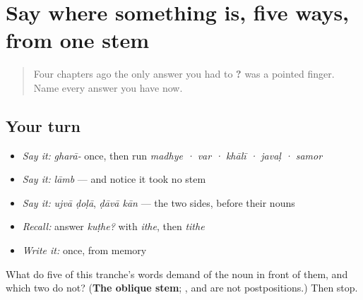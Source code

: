 \section[\texorpdfstring{\mr{उजवा} · \mr{डावा} (ujvā · ḍāvā)}{उजवा · डावा (ujvā · ḍāvā)}]{Say where something is, five ways, from one stem}

\label{lesson:MR-R44-directions}



\begin{quote}
Four chapters ago the only answer you had to \textbf{?} was a pointed finger. Name every answer you have now.
\end{quote}

\subsection*{Your turn}
\begin{itemize}
\raggedright
  \item \emph{Say it:} \emph{gharā-} once, then run \emph{madhye · var · khālī · javaḷ · samor}
  \item \emph{Say it:} \emph{lāmb} — and notice it took no stem
  \item \emph{Say it:} \emph{ujvā ḍoḷā}, \emph{ḍāvā kān} — the two sides, before their nouns
  \item \emph{Recall:} answer \emph{kuṭhe?} with \emph{ithe}, then \emph{tithe}
  \item \emph{Write it:} \textbf{} once, from memory
\end{itemize}

\begin{tcolorbox}[breakable,colback=teal!4,colframe=teal!35!black,title={Before you move on}]
What do five of this tranche's words demand of the noun in front of them, and which two do not? (\textbf{The oblique stem}; \textbf{}, \textbf{} and \textbf{} are not postpositions.) Then stop.
\end{tcolorbox}
